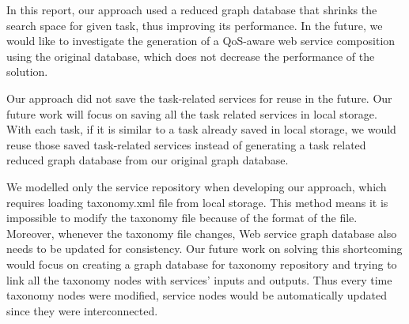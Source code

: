 In this report, our approach used a reduced graph database that shrinks the search space for given task, thus improving its performance. In the future, we would like to investigate the generation of a QoS-aware web service composition using the original database, which does not decrease the performance of the solution. \par

Our approach did not save the task-related services for reuse in the future. Our future work will focus on saving all the task related services in local storage. With each task, if it is similar to a task already saved in local storage, we would reuse those saved task-related services instead of generating a task related reduced graph database from our original graph database. \par

We modelled only the service repository when developing our approach, which requires loading taxonomy.xml file from local storage. This method means it is impossible to modify the taxonomy file because of the format of the file. Moreover, whenever the taxonomy file changes, Web service graph database also needs to be updated for consistency.  Our future work on solving this shortcoming would focus on creating a graph database for taxonomy repository and trying to link all the taxonomy nodes with services' inputs and outputs. Thus every time taxonomy nodes were modified, service nodes would be automatically updated since they were interconnected. \par
